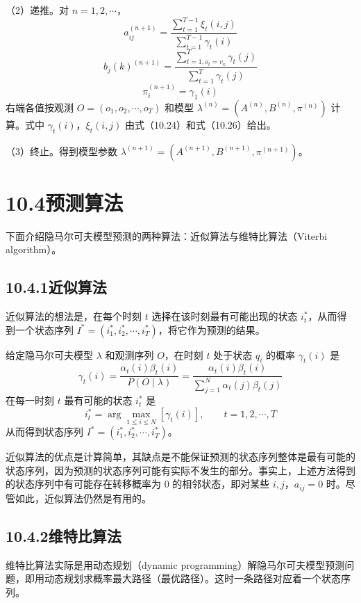 \documentclass[UTF8, 12pt, fontset=fandol, oneside]{ctexart}
\begin{document}
（2）递推。对 $n=1,2,\cdots$，
\[
  a_{ij}^{(n+1)}
  =\frac{\sum_{t=1}^{T-1}\xi_t(i,j)}{\sum_{t=1}^{T-1}\gamma_t(i)}
\]
\[
  b_j(k)^{(n+1)}
  =\frac{\sum_{t=1,o_t=v_k}^{T}\gamma_t(j)}{\sum_{t=1}^{T}\gamma_t(j)}
\]
\[
  \pi_i^{(n+1)}=\gamma_1(i)
\]
右端各值按观测 $O=(o_1,o_2,\cdots,o_T)$ 和模型 $\lambda^{(n)}=(A^{(n)},B^{(n)},\pi^{(n)})$ 计算。式中 $\gamma_t(i)$，$\xi_t(i,j)$ 由式（10.24）和式（10.26）给出。

（3）终止。得到模型参数 $\lambda^{(n+1)}=(A^{(n+1)},B^{(n+1)},\pi^{(n+1)})$。

\section*{10.4\quad 预测算法}

下面介绍隐马尔可夫模型预测的两种算法：近似算法与维特比算法（Viterbi algorithm）。

\subsection*{10.4.1\quad 近似算法}

近似算法的想法是，在每个时刻 $t$ 选择在该时刻最有可能出现的状态 $i_t^*$，从而得到一个状态序列 $I^*=(i_1^*,i_2^*,\cdots,i_T^*)$，将它作为预测的结果。

给定隐马尔可夫模型 $\lambda$ 和观测序列 $O$，在时刻 $t$ 处于状态 $q_i$ 的概率 $\gamma_t(i)$ 是
\begin{equation}
  \gamma_t(i)=\frac{\alpha_t(i)\beta_t(i)}{P(O\mid\lambda)}
  =\frac{\alpha_t(i)\beta_t(i)}{\sum_{j=1}^N\alpha_t(j)\beta_t(j)}
  \tag{10.42}
\end{equation}
在每一时刻 $t$ 最有可能的状态 $i_t^*$ 是
\begin{equation}
  i_t^*=\arg\max_{1\le i\le N}[\gamma_t(i)],\qquad t=1,2,\cdots,T
  \tag{10.43}
\end{equation}
从而得到状态序列 $I^*=(i_1^*,i_2^*,\cdots,i_T^*)$。

近似算法的优点是计算简单，其缺点是不能保证预测的状态序列整体是最有可能的状态序列，因为预测的状态序列可能有实际不发生的部分。事实上，上述方法得到的状态序列中有可能存在转移概率为 $0$ 的相邻状态，即对某些 $i,j$，$a_{ij}=0$ 时。尽管如此，近似算法仍然是有用的。

\subsection*{10.4.2\quad 维特比算法}

维特比算法实际是用动态规划（dynamic programming）解隐马尔可夫模型预测问题，即用动态规划求概率最大路径（最优路径）。这时一条路径对应着一个状态序列。
\end{document}
